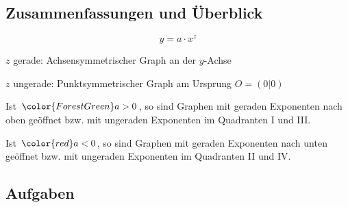 

\subsection{Zusammenfassungen und Überblick}

$$y = a\cdot{}x^z$$

$z$ gerade: Achsensymmetrischer Graph an der $y$-Achse

$z$ ungerade: Punktsymmetrischer Graph am Ursprung $O=(0|0)$

Ist ${\color{ForestGreen}a>0}$, so sind Graphen mit
geraden Exponenten nach oben geöffnet bzw. mit ungeraden Exponenten im
Quadranten I und III.

Ist ${\color{red}a<0}$, so sind Graphen mit
geraden Exponenten nach unten geöffnet bzw. mit ungeraden Exponenten
im Quadranten II und IV.




\subsection*{Aufgaben}

\newpage

